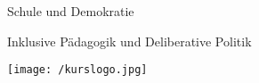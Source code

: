 \documentclass{newlayout}
\begin{document}
 \setcounter{page}{3}

\setcounter{tocdepth}{1}
 \tableofcontents

   \setcounter{secnumdepth}{1}


\setcounter{page}{7}
\setcounter{chapter}{0}




\begin{coursetitle}
  \centerline{Schule und Demokratie}
  \bigskip
  \Large \centerline{Inklusive Pädagogik und Deliberative Politik}
  \bigskip
 \texttt{[image: /kurslogo.jpg]}
 \label{fig:meinbild}
  \bigskip
\end{coursetitle}



\end{document}
